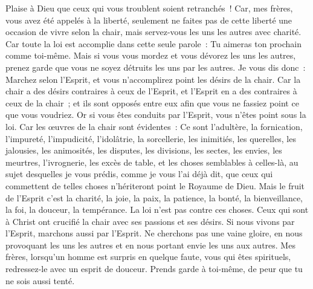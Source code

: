 \begin{multicols}{2}
Plaise à Dieu que ceux qui vous troublent soient retranchés~!
Car, mes frères, vous avez été appelés à la liberté, seulement ne faites pas de cette liberté une occasion de vivre selon la chair, mais servez-vous les uns les autres avec charité.
Car toute la loi est accomplie dans cette seule parole~: Tu aimeras ton prochain comme toi-même.
Mais si vous vous mordez et vous dévorez les uns les autres, prenez garde que vous ne soyez détruits les uns par les autres.
Je vous dis donc~: Marchez selon l'Esprit, et vous n'accomplirez point les désirs de la chair.
Car la chair a des désirs contraires à ceux de l'Esprit, et l'Esprit en a des contraires à ceux de la chair~; et ils sont opposés entre eux afin que vous ne fassiez point ce que vous voudriez.
Or si vous êtes conduits par l'Esprit, vous n'êtes point sous la loi.
Car les œuvres de la chair sont évidentes~: Ce sont l'adultère, la fornication, l'impureté, l'impudicité,
l'idolâtrie, la sorcellerie, les inimitiés, les querelles, les jalousies, les animosités, les disputes, les divisions, les sectes,
les envies, les meurtres, l'ivrognerie, les excès de table, et les choses semblables à celles-là, au sujet desquelles je vous prédis, comme je vous l'ai déjà dit, que ceux qui commettent de telles choses n'hériteront point le Royaume de Dieu.
Mais le fruit de l'Esprit c'est la charité, la joie, la paix, la patience, la bonté, la bienveillance, la foi, la douceur, la tempérance.
La loi n'est pas contre ces choses.
Ceux qui sont à Christ ont crucifié la chair avec ses passions et ses désirs.
Si nous vivons par l'Esprit, marchons aussi par l'Esprit.
Ne cherchons pas une vaine gloire, en nous provoquant les uns les autres et en nous portant envie les uns aux autres.
\VerseOne{}Mes frères, lorsqu'un homme est surpris en quelque faute, vous qui êtes spirituels, redressez-le avec un esprit de douceur. Prends garde à toi-même, de peur que tu ne sois aussi tenté.

\end{multicols}
